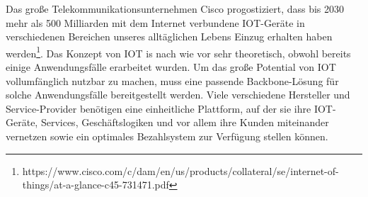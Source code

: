 \documentclass[
    ngerman,american
    ]{scrartcl}
\newcommand{\lang}{de}
\begin{document}
\begin{description}[style=unboxed]
	\item [\questionTwo{\lang}]
	Das große Telekommunikationsunternehmen Cisco progostiziert, dass bis 2030 mehr als 500 Milliarden mit dem Internet verbundene IOT-Geräte in verschiedenen Bereichen unseres alltäglichen Lebens Einzug erhalten haben werden\footnote{https://www.cisco.com/c/dam/en/us/products/collateral/se/internet-of-things/at-a-glance-c45-731471.pdf}. Das Konzept von IOT is nach wie vor sehr theoretisch, obwohl bereits einige Anwendungsfälle erarbeitet wurden. Um das große Potential von IOT vollumfänglich nutzbar zu machen, muss eine passende Backbone-Lösung für solche Anwendungsfälle bereitgestellt werden. Viele verschiedene Hersteller und Service-Provider benötigen eine einheitliche Plattform, auf der sie ihre IOT-Geräte, Services, Geschäftslogiken und vor allem ihre Kunden miteinander vernetzen sowie ein optimales Bezahlsystem zur Verfügung stellen können.



\end{description}
\end{document}
